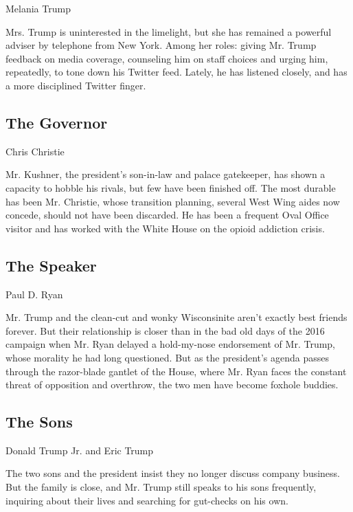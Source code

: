 Melania Trump

Mrs. Trump is uninterested in the limelight, but she has remained a
powerful adviser by telephone from New York. Among her roles: giving Mr.
Trump feedback on media coverage, counseling him on staff choices and
urging him, repeatedly, to tone down his Twitter feed. Lately, he has
listened closely, and has a more disciplined Twitter finger.

\hypertarget{the-governor}{%
\subsection{The Governor}\label{the-governor}}

Chris Christie

Mr. Kushner, the president's son-in-law and palace gatekeeper, has shown
a capacity to hobble his rivals, but few have been finished off. The
most durable has been Mr. Christie, whose transition planning, several
West Wing aides now concede, should not have been discarded. He has been
a frequent Oval Office visitor and has worked with the White House on
the opioid addiction crisis.

\hypertarget{the-speaker}{%
\subsection{The Speaker}\label{the-speaker}}

Paul D. Ryan

Mr. Trump and the clean-cut and wonky Wisconsinite aren't exactly best
friends forever. But their relationship is closer than in the bad old
days of the 2016 campaign when Mr. Ryan delayed a hold-my-nose
endorsement of Mr. Trump, whose morality he had long questioned. But as
the president's agenda passes through the razor-blade gantlet of the
House, where Mr. Ryan faces the constant threat of opposition and
overthrow, the two men have become foxhole buddies.

\hypertarget{the-sons}{%
\subsection{The Sons}\label{the-sons}}

Donald Trump Jr. and Eric Trump

The two sons and the president insist they no longer discuss company
business. But the family is close, and Mr. Trump still speaks to his
sons frequently, inquiring about their lives and searching for
gut-checks on his own.

